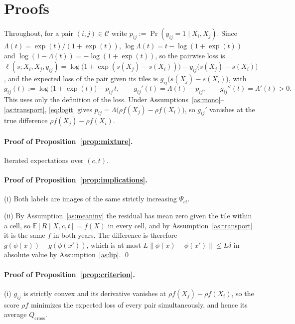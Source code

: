 \documentclass[11pt]{article}
\theoremstyle{remark}
\newcommand{\E}{\mathbb{E}}
\newcommand{\Qc}{Q_{\mathrm{cross}}}
\newcommand{\Cc}{\mathcal{C}}
\begin{document}



\appendix

\section{Proofs}\label{app:proofs}

Throughout, for a pair $(i,j)\in\Cc$ write $p_{ij} := \Pr(y_{ij}=1\mid X_i,X_j)$. Since
$\Lambda(t) = \exp(t)/(1+\exp(t))$, $\log\Lambda(t) = t - \log(1+\exp(t))$ and
$\log(1-\Lambda(t)) = -\log(1+\exp(t))$, so the pairwise loss is
$\ell(s;X_i,X_j,y_{ij}) = \log\big(1+\exp(s(X_j)-s(X_i))\big) - y_{ij}\big(s(X_j)-s(X_i)\big)$, and the
expected loss of the pair given its tiles is $g_{ij}\big(s(X_j)-s(X_i)\big)$, with
\[
    g_{ij}(t) := \log\big(1+\exp(t)\big) - p_{ij}\,t,
    \qquad
    g_{ij}'(t) = \Lambda(t) - p_{ij},
    \qquad
    g_{ij}''(t) = \Lambda'(t) > 0 .
\]
This uses only the definition of the loss. Under Assumptions~\ref{as:mono}--\ref{as:transport},
\eqref{eq:logit} gives $p_{ij} = \Lambda\big(\rho f(X_j)-\rho f(X_i)\big)$, so $g_{ij}'$ vanishes at the
true difference $\rho f(X_j)-\rho f(X_i)$.

\paragraph{Proof of Proposition~\ref{prop:mixture}.} Iterated expectations over $(c,t)$.

\paragraph{Proof of Proposition~\ref{prop:implications}.} (i) Both labels are images of the same
strictly increasing $\Psi_{ct}$.

(ii) By Assumption~\ref{as:meaninv} the residual has mean zero given the tile within a cell, so
$\E[R\mid X, c,t] = f(X)$ in every cell, and by Assumption~\ref{as:transport} it is the same $f$ in
both years. The difference is therefore $g(\phi(x)) - g(\phi(x'))$, which is at most
$L\|\phi(x)-\phi(x')\| \le L\delta$ in absolute value by Assumption~\ref{as:lip}. \qed

\paragraph{Proof of Proposition~\ref{prop:criterion}.} (i) $g_{ij}$ is strictly convex and its
derivative vanishes at $\rho f(X_j)-\rho f(X_i)$, so the score $\rho f$ minimizes the expected loss of
every pair simultaneously, and hence its average $\Qc$.
\end{document}
